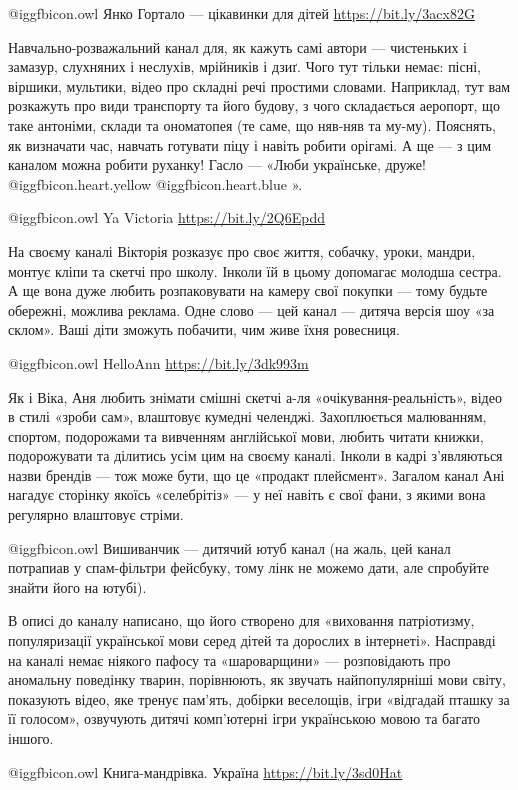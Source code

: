  @igg{fbicon.owl} Янко Гортало — цікавинки для дітей \url{https://bit.ly/3acx82G}

Навчально-розважальний канал для, як кажуть самі автори — чистеньких і замазур,
слухняних і неслухів, мрійників і дзиґ. Чого тут тільки немає: пісні, віршики,
мультики, відео про складні речі простими словами. Наприклад, тут вам розкажуть
про види транспорту та його будову, з чого складається аеропорт, що таке
антоніми, склади та ономатопея (те саме, що няв-няв та му-му). Пояснять, як
визначати час, навчать готувати піцу і навіть робити орігамі. А ще — з цим
каналом можна робити руханку! Гасло — «Люби українське, друже!  @igg{fbicon.heart.yellow}  @igg{fbicon.heart.blue} ».

 @igg{fbicon.owl} Ya Victoria \url{https://bit.ly/2Q6Epdd}

На своєму каналі Вікторія розказує про своє життя, собачку, уроки, мандри,
монтує кліпи та скетчі про школу. Інколи їй в цьому допомагає молодша сестра. А
ще вона дуже любить розпаковувати на камеру свої покупки — тому будьте
обережні, можлива реклама. Одне слово — цей канал — дитяча версія шоу «за
склом». Ваші діти зможуть побачити, чим живе їхня ровесниця.

 @igg{fbicon.owl} HelloAnn \url{https://bit.ly/3dk993m}

Як і Віка, Аня любить знімати смішні скетчі а-ля «очікування-реальність», відео
в стилі «зроби сам», влаштовує кумедні челенджі. Захоплюється малюванням,
спортом, подорожами та вивченням англійської мови, любить читати книжки,
подорожувати та ділитись усім цим на своєму каналі. Інколи в кадрі з’являються
назви брендів — тож може бути, що це «продакт плейсмент». Загалом канал Ані
нагадує сторінку якоїсь «селебрітіз» — у неї навіть є свої фани, з якими вона
регулярно влаштовує стріми.

 @igg{fbicon.owl} Вишиванчик — дитячий ютуб канал (на жаль, цей канал потрапиав у спам-фільтри
фейсбуку, тому лінк не можемо дати, але спробуйте знайти його на ютубі).

В описі до каналу написано, що його створено для «виховання патріотизму,
популяризації української мови серед дітей та дорослих в інтернеті». Насправді
на каналі немає ніякого пафосу та «шароварщини» — розповідають про аномальну
поведінку тварин, порівнюють, як звучать найпопулярніші мови світу, показують
відео, яке тренує пам’ять, добірки веселощів, ігри «відгадай пташку за її
голосом», озвучують дитячі комп’ютерні ігри українською мовою та багато іншого.

 @igg{fbicon.owl} Книга-мандрівка. Україна \url{https://bit.ly/3sd0Hat}

